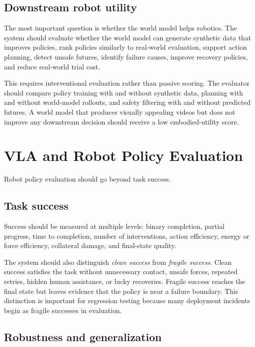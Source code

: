 \documentclass[sigconf,review,anonymous]{acmart}
\begin{document}
\subsection{Downstream robot utility}

The most important question is whether the world model helps robotics. The system should evaluate whether the world model can generate synthetic data that improves policies, rank policies similarly to real-world evaluation, support action planning, detect unsafe futures, identify failure causes, improve recovery policies, and reduce real-world trial cost.

This requires interventional evaluation rather than passive scoring. The evaluator should compare policy training with and without synthetic data, planning with and without world-model rollouts, and safety filtering with and without predicted futures. A world model that produces visually appealing videos but does not improve any downstream decision should receive a low embodied-utility score.

\section{VLA and Robot Policy Evaluation}

Robot policy evaluation should go beyond task success.

\subsection{Task success}

Success should be measured at multiple levels: binary completion, partial progress, time to completion, number of interventions, action efficiency, energy or force efficiency, collateral damage, and final-state quality.

The system should also distinguish \emph{clean success} from \emph{fragile success}. Clean success satisfies the task without unnecessary contact, unsafe forces, repeated retries, hidden human assistance, or lucky recoveries. Fragile success reaches the final state but leaves evidence that the policy is near a failure boundary. This distinction is important for regression testing because many deployment incidents begin as fragile successes in evaluation.

\subsection{Robustness and generalization}
\end{document}
